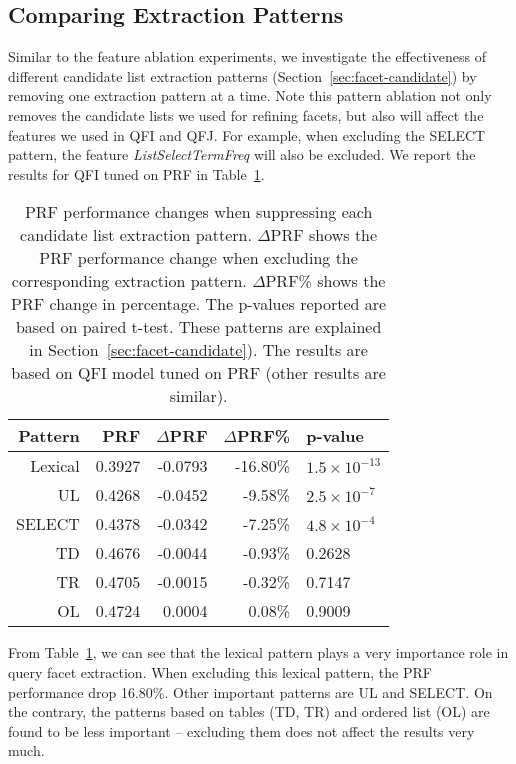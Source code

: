 \subsection{Comparing Extraction Patterns}
Similar to the feature ablation experiments, we investigate the effectiveness of different candidate list extraction patterns (Section~\ref{sec:facet-candidate}) by removing one extraction pattern at a time. Note this pattern ablation not only removes the candidate lists we used for refining facets, but also will affect the features we used in QFI and QFJ. For example, when excluding the SELECT pattern, the feature \textit{ListSelectTermFreq} will also be excluded. We report the results for QFI tuned on PRF in Table~\ref{tab:intrinsic-clists}.
\begin{table}[H]
\centering
\caption{PRF performance changes when suppressing each candidate list extraction pattern. $\Delta$PRF shows the PRF performance change when excluding the corresponding extraction pattern. $\Delta$PRF\% shows the PRF change in percentage. The p-values reported are based on paired t-test. These patterns are explained in Section~\ref{sec:facet-candidate}). The results are based on QFI model tuned on PRF (other results are similar).}
\label{tab:intrinsic-clists}
\begin{tabular}{|r|r|r|r|l|} \hline
Pattern & PRF & $\Delta$PRF & $\Delta$PRF\% & p-value\\ \hline
Lexical & 0.3927 & -0.0793 & -16.80\% & $1.5\times10^{-13}$ \\ \hline
UL & 0.4268 & -0.0452 & -9.58\% & $2.5\times10^{-7}$ \\ \hline
SELECT & 0.4378 & -0.0342 & -7.25\% & $4.8\times10^{-4}$ \\ \hline
TD & 0.4676 & -0.0044 & -0.93\% & 0.2628 \\ \hline
TR & 0.4705 & -0.0015 & -0.32\% & 0.7147 \\ \hline
OL & 0.4724 & 0.0004 & 0.08\% & 0.9009 \\ \hline
\end{tabular}
\end{table}
From Table~\ref{tab:intrinsic-clists}, we can see that the lexical pattern plays a very importance role in query facet extraction. When excluding this lexical pattern, the PRF performance drop 16.80\%. Other important patterns are UL and SELECT. On the contrary, the patterns based on tables (TD, TR) and ordered list (OL) are found to be less important -- excluding them does not affect the results very much.

